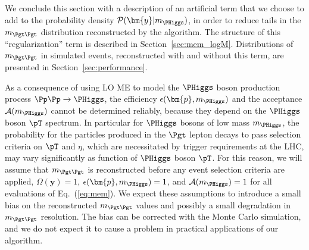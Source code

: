 We conclude this section with a description of an artificial term that we
choose to add to the probability density $\mathcal{P}(\bm{y}|m_{\PHiggs})$, in
order to reduce tails in the $m_{\Pgt\Pgt}$ distribution reconstructed
by the algorithm. The structure of this ``regularization'' term is described in
Section~\ref{sec:mem_logM}.
Distributions of $m_{\Pgt\Pgt}$ in simulated events,
reconstructed with and without this term, are presented in Section~\ref{sec:performance}.

As a consequence of using LO ME to model the $\PHiggs$ boson production process $\Pp\Pp \to \PHiggs$,
the efficiency $\epsilon(\bm{p},m_{\PHiggs})$ and the acceptance $\mathcal{A}(m_{\PHiggs})$ cannot be determined reliably,
because they depend on the $\PHiggs$ boson $\pT$ spectrum.
In particular for $\PHiggs$ bosons of low mass $m_{\PHiggs}$,
the probability for the particles produced in the $\Pgt$ lepton decays to pass selection criteria on $\pT$ and $\eta$, 
which are necessitated by trigger requirements at the LHC,
may vary significantly as function of $\PHiggs$ boson $\pT$.
For this reason, we will assume that $m_{\Pgt\Pgt}$ is reconstructed before any event selection criteria are applied,
\ie $\Omega(\bm{y}) = 1$, $\epsilon(\bm{p},m_{\PHiggs}) = 1$, and $\mathcal{A}(m_{\PHiggs}) = 1$
for all evaluations of Eq.~(\ref{eq:mem}).
We expect these assumptions to introduce a small bias on the reconstructed $m_{\Pgt\Pgt}$ values
and possibly a small degradation in $m_{\Pgt\Pgt}$ resolution.
The bias can be corrected with the Monte Carlo simulation, 
and we do not expect it to cause a problem in practical applications of our algorithm.




